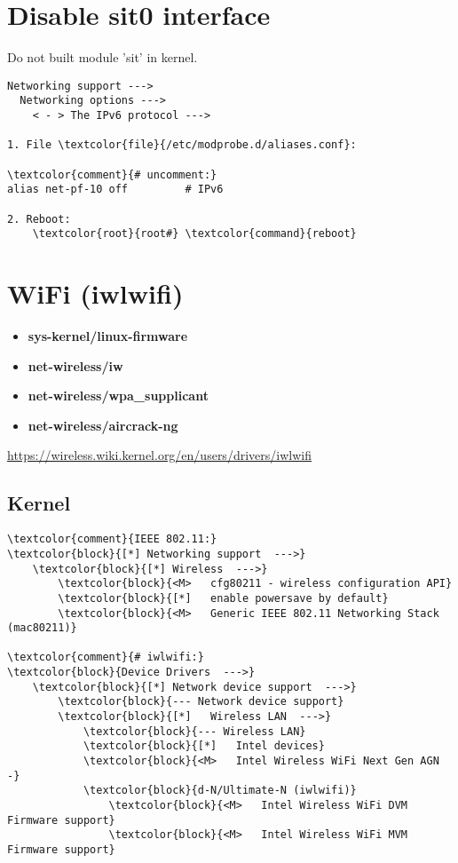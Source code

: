 \documentclass[10pt, a4paper, onecolumn, openany]{book}         %
\begin{document}
\section{Disable sit0 interface}
Do not built module 'sit' in kernel.
\begin{Verbatim}[commandchars=\\\{\}]
Networking support --->
  Networking options --->
    < - > The IPv6 protocol --->

1. File \textcolor{file}{/etc/modprobe.d/aliases.conf}:

\textcolor{comment}{# uncomment:}
alias net-pf-10 off         # IPv6

2. Reboot:
    \textcolor{root}{root#} \textcolor{command}{reboot}
\end{Verbatim}



\section{WiFi (iwlwifi)}
\begin{itemize}
    \item \textbf{sys-kernel/linux-firmware}
    \item \textbf{net-wireless/iw}
    \item \textbf{net-wireless/wpa\_supplicant}
    \item \textbf{net-wireless/aircrack-ng}
\end{itemize}
\underline{\url{https://wireless.wiki.kernel.org/en/users/drivers/iwlwifi}}
\subsection{Kernel}
\begin{Verbatim}[commandchars=\\\{\}]
\textcolor{comment}{IEEE 802.11:}
\textcolor{block}{[*] Networking support  --->}
    \textcolor{block}{[*] Wireless  --->}
        \textcolor{block}{<M>   cfg80211 - wireless configuration API}
        \textcolor{block}{[*]   enable powersave by default}
        \textcolor{block}{<M>   Generic IEEE 802.11 Networking Stack (mac80211)}

\textcolor{comment}{# iwlwifi:}
\textcolor{block}{Device Drivers  --->}
    \textcolor{block}{[*] Network device support  --->}
        \textcolor{block}{--- Network device support}
        \textcolor{block}{[*]   Wireless LAN  --->}
            \textcolor{block}{--- Wireless LAN}
            \textcolor{block}{[*]   Intel devices}
            \textcolor{block}{<M>   Intel Wireless WiFi Next Gen AGN -}
            \textcolor{block}{d-N/Ultimate-N (iwlwifi)}
                \textcolor{block}{<M>   Intel Wireless WiFi DVM Firmware support}
                \textcolor{block}{<M>   Intel Wireless WiFi MVM Firmware support}
\end{Verbatim}
\end{document}
